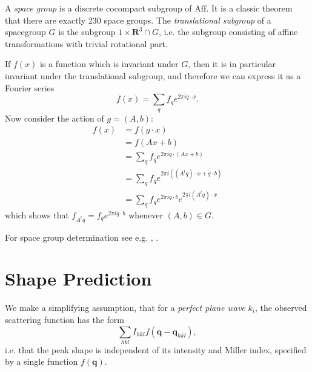 \documentclass[twocolumn,preprintnumbers,amsmath,amssymb]{revtex4}
\newcommand{\bq}{\mathbf{q}}
\newcommand{\Aff}{\mathrm{Aff}}
\begin{document}
A \emph{space group} is a discrete cocompact subgroup of $\Aff$. It is a classic theorem that there are exactly 230 space groups.
The \emph{translational subgroup} of a spacegroup $G$ is the subgroup ${1} \times \mathbf{R}^3 \cap G$, i.e. the subgroup consisting of
affine transformations with trivial rotational part.

If $f(x)$ is a function which is invariant under $G$, then it
is in particular invariant under the translational subgroup, and therefore we can express it as a Fourier series
\begin{equation} f(x) = \sum_q f_q e^{2\pi i q \cdot x}. \end{equation}
Now consider the action of $g = (A,b)$:
\begin{align}
  f(x)
  &= f(g\cdot x) \\
  &= f(Ax + b) \\
  &= \sum_q f_q e^{2\pi i q \cdot (Ax + b)} \\
  &= \sum_q f_q e^{2\pi i ((A^t q) \cdot x + q \cdot b)} \\
  &= \sum_q f_q e^{2 \pi i q \cdot b} e^{2\pi i (A^t q) \cdot x}
\end{align}
which shows that $f_{A^t q} = f_{q} e^{2 \pi i q \cdot b}$ whenever $(A,b) \in G$.


For space group determination see e.g. \cite{evans-2011}, \cite{kabsch-2010}.


\section{Shape Prediction} \label{peak-prediction}
We make a simplifying assumption, that for a \emph{perfect plane wave} $k_i$, the observed scattering function has the form
\begin{equation} \sum_{hkl} I_{hkl} f(\bq - \bq_{hkl}), \end{equation}
i.e. that the peak shape is independent of its intensity and Miller index, specified by a single function $f(\bq)$.
\end{document}
